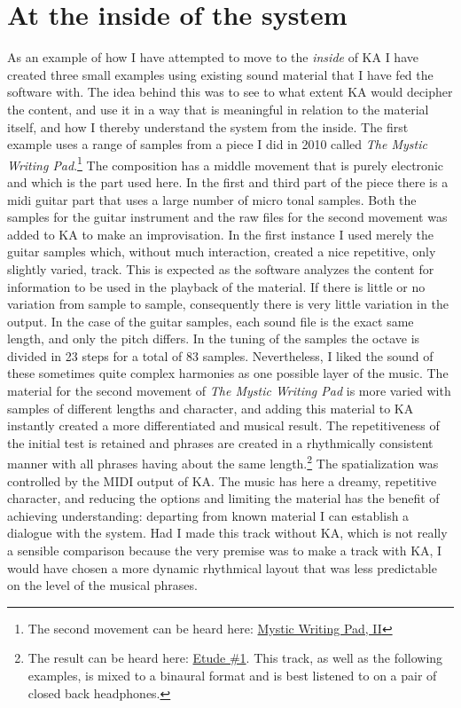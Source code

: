 \documentclass[11pt]{article}
\begin{document}
\section*{At the inside of the system}
\label{sec:org200aa55}
As an example of how I have attempted to move to the \emph{inside} of KA I have created three small examples using existing sound material that I have fed the software with. The idea behind this was to see to what extent KA would decipher the content, and use it in a way that is meaningful in relation to the material itself, and how I thereby understand the system from the inside. The first example uses a range of samples from a piece I did in 2010 called \emph{The Mystic Writing Pad}.\footnote{The second movement can be heard here: \href{../../../../Dropbox/Music/music/Frisk/Mystic-tape.aif}{Mystic Writing Pad, II}} The composition has a middle movement that is purely electronic and which is the part used here. In the first and third part of the piece there is a midi guitar part that uses a large number of micro tonal samples. Both the samples for the guitar instrument and the raw files for the second movement was added to KA to make an improvisation. In the first instance I used merely the guitar samples which, without much interaction, created a nice repetitive, only slightly varied, track. This is expected as the software analyzes the content for information to be used in the playback of the material. If there is little or no variation from sample to sample, consequently there is very little variation in the output. In the case of the guitar samples, each sound file is the exact same length, and only the pitch differs. In the tuning of the samples the octave is divided in 23 steps for a total of 83 samples. Nevertheless, I liked the sound of these sometimes quite complex harmonies as one possible layer of the music. The material for the second movement of \emph{The Mystic Writing Pad} is more varied with samples of different lengths and character, and adding this material to KA instantly created a more differentiated and musical result. The repetitiveness of the initial test is retained and phrases are created in a rhythmically consistent manner with all phrases having about the same length.\footnote{The result can be heard here: \href{/home/henrikfr/Docs/uppdrag/GI/kimauto/final\_project/final\_stuff/KA\_example\_2.wav}{Etude \#1}. This track, as well as the following examples, is mixed to a binaural format and is best listened to on a pair of closed back headphones.\label{orgc839b28}} The spatialization was controlled by the MIDI output of KA. The music has here a dreamy, repetitive character, and reducing the options and limiting the material has the benefit of achieving understanding: departing from known material I can establish a dialogue with the system. Had I made this track without KA, which is not really a sensible comparison because the very premise was to make a track with KA, I would have chosen a more dynamic rhythmical layout that was less predictable on the level of the musical phrases.
\end{document}
